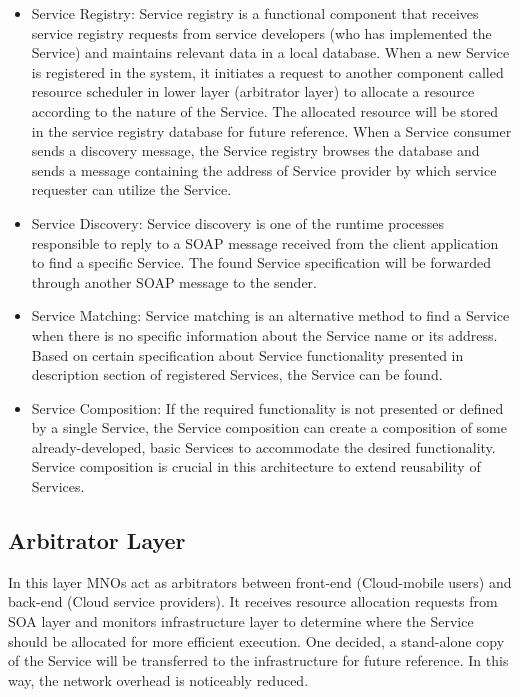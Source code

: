 \documentclass[conference]{IEEEtran}
\begin{document}
\begin{itemize}
\item Service Registry: Service registry is a functional component that receives service registry requests from service developers (who has implemented the Service) and maintains relevant data in a local database. When a new Service is registered in the system, it initiates a request to another component called resource scheduler in lower layer (arbitrator layer) to allocate a resource according to the nature of the Service. The allocated resource will be stored in the service registry database for future reference. When a Service consumer sends a discovery message, the Service registry browses the database and sends a message containing the address of Service provider by which service requester can utilize the Service.

\item Service Discovery: Service discovery is one of the runtime processes responsible to reply to a SOAP message received from the client application to find a specific Service. The found Service specification will be forwarded through another SOAP message to the sender.

\item Service Matching: Service matching is an alternative method to find a Service when there is no specific information about the Service name or its address. Based on certain specification about Service functionality presented in description section of registered Services, the Service can be found.

\item Service Composition: If the required functionality is not presented or defined by a single Service, the Service composition can create a composition of some already-developed, basic Services to accommodate the desired functionality. Service composition is crucial in this architecture to extend reusability of Services.

\end{itemize}
\subsection{Arbitrator Layer} 
In this layer MNOs act as arbitrators between front-end (Cloud-mobile users) and back-end (Cloud service providers). It receives resource allocation requests from SOA layer and monitors infrastructure layer to determine where the Service should be allocated for more efficient execution. One decided, a stand-alone copy of the Service will be transferred to the infrastructure for future reference. In this way, the network overhead is noticeably reduced. 
\end{document}
